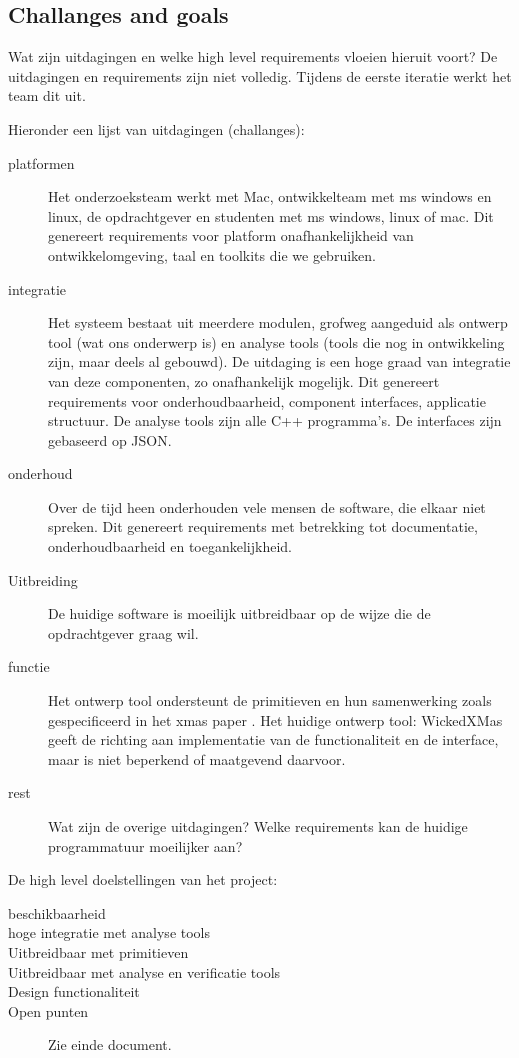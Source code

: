 \subsection{Challanges and goals}\label{sec: challanges goals}

Wat zijn uitdagingen en welke high level requirements vloeien hieruit voort? De uitdagingen en requirements
zijn niet volledig. Tijdens de eerste iteratie werkt het team dit uit.

Hieronder een lijst van uitdagingen (challanges):

\begin{description}
 \item[platformen] Het onderzoeksteam werkt met Mac, ontwikkelteam met ms windows en linux, de opdrachtgever en studenten met ms windows, linux of mac.
		    Dit genereert requirements voor platform onafhankelijkheid van ontwikkelomgeving, taal en toolkits die we gebruiken.
 \item[integratie] Het systeem bestaat uit meerdere modulen, grofweg aangeduid als ontwerp tool (wat ons onderwerp is) en analyse tools (tools die nog
		    in ontwikkeling zijn, maar deels al gebouwd). De uitdaging is een hoge graad van integratie van deze componenten, zo onafhankelijk mogelijk.
		    Dit genereert requirements voor onderhoudbaarheid, component interfaces, applicatie structuur. De analyse tools zijn alle C++ programma's.
		    De interfaces zijn gebaseerd op JSON.
 \item[onderhoud] Over de tijd heen onderhouden vele mensen de software, die elkaar niet spreken. Dit genereert requirements met betrekking tot documentatie,
		    onderhoudbaarheid en toegankelijkheid.
 \item[Uitbreiding] De huidige software is moeilijk uitbreidbaar op de wijze die de opdrachtgever graag wil.
 \item[functie] Het ontwerp tool ondersteunt de primitieven en hun samenwerking zoals gespecificeerd in het xmas paper \cite{chatterjee-kishinevsky:xmas}.
		Het  huidige ontwerp tool: WickedXMas geeft de richting aan implementatie van de functionaliteit en de interface, maar is
		niet beperkend of maatgevend daarvoor.
 \item[rest]	Wat zijn de overige uitdagingen? Welke requirements kan de huidige programmatuur moeilijker aan?
\end{description}

De high level doelstellingen van het project:

\begin{description}
 \item[beschikbaarheid]
 \item[hoge integratie met analyse tools]
 \item[Uitbreidbaar met primitieven]
 \item[Uitbreidbaar met analyse en verificatie tools]
 \item[Design functionaliteit]
 \item[Open punten] Zie einde document.
\end{description}

